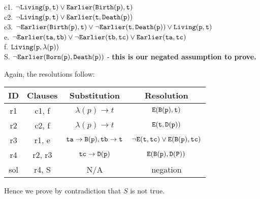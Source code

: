 \documentclass{article}
\begin{document}
\begin{enumerate}
		c1. ${\tt \neg Living(p,t) \vee Earlier(Birth(p), t)}$\\
		c2. ${\tt \neg Living(p,t) \vee Earlier(t, Death(p))}$\\
		c3. ${\tt \neg Earlier(Birth(p),t) \vee \neg Earlier(t, Death(p)) \vee Living(p,t)}$\\
		e.\phantom{1} ${\tt \neg Earlier(ta, tb) \vee \neg Earlier(tb, tc) \vee Earlier(ta, tc)}$\\
		f.\phantom{1} ${\tt Living(p, \lambda(p))}$\\
		S. ${\tt \neg Earlier(Born(p), Death(p))}$ - \textbf{this is our negated assumption to prove.}
		
		Again, the resolutions follow:
		
		\begin{tabular}{|c|c|c|c|}
			\hline
			ID & Clauses & Substitution & Resolution\\
			\hline
			r1 & c1, f & $\lambda(p) \rightarrow t$ & ${\tt E(B(p),t)}$\\
			\hline
			r2 & c2, f & $\lambda(p) \rightarrow t$ & ${\tt E(t,D(p))}$\\
			\hline
			r3 & r1, e & ${\tt ta \rightarrow B(p), tb \rightarrow t}$ & ${\tt \neg E(t, tc) \vee E(B(p),tc)}$\\
			\hline
			r4 & r2, r3 & ${\tt tc \rightarrow D(p)}$ & ${\tt E(B(p), D(P))}$\\
			\hline
			sol & r4, S & N/A & negation\\
			\hline
		\end{tabular}
	
		Hence we prove by contradiction that $S$ is not true.
		 
	\end{enumerate}
\end{document}
